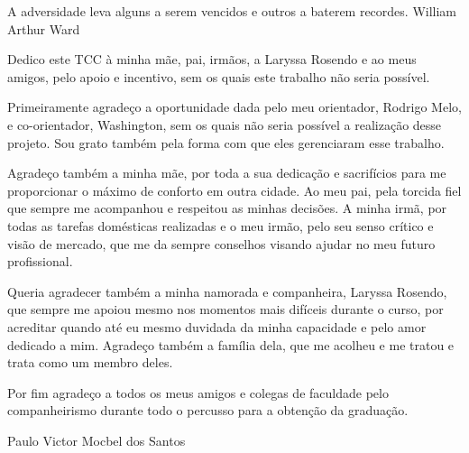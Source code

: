 \documentclass{./public/ufpatccdoisautores}
\begin{document}

\begin{ufpaEpigrafe}
A adversidade leva alguns a serem vencidos e
 outros a baterem recordes. William Arthur Ward
\end{ufpaEpigrafe}

\ufpaPaginaDeAprovacao

\begin{ufpaOferecimento}
    Dedico este TCC à minha mãe, pai, irmãos, a Laryssa Rosendo e ao meus amigos, pelo apoio e incentivo,
    sem os quais este trabalho não seria possível.
\end{ufpaOferecimento}

\begin{ufpaAgradecimentos}
	Primeiramente agradeço a oportunidade dada pelo meu orientador, Rodrigo Melo, e co-orientador, Washington, sem os quais não seria possível a realização desse projeto. Sou grato também pela forma com que eles gerenciaram esse trabalho.

	Agradeço também a minha mãe, por toda a sua dedicação e sacrifícios para me proporcionar o máximo de conforto em outra cidade. Ao meu pai, pela torcida fiel que sempre me acompanhou e respeitou as minhas decisões. A minha irmã, por todas as tarefas domésticas realizadas e o meu irmão, pelo seu senso crítico e visão de mercado, que me da sempre conselhos visando ajudar no meu futuro profissional.

	Queria agradecer também a minha namorada e companheira, Laryssa Rosendo, que sempre me apoiou mesmo nos momentos mais difíceis durante o curso, por acreditar quando até eu mesmo duvidada da minha capacidade e pelo amor dedicado a mim. Agradeço também a família dela, que me acolheu e me tratou e trata como um membro deles.

	Por fim agradeço a todos os meus amigos e colegas de faculdade pelo companheirismo durante todo o percusso para a obtenção da graduação.
	\begin{flushright}
		Paulo Victor Mocbel dos Santos
	\end{flushright}

\end{ufpaAgradecimentos}
\end{document}
